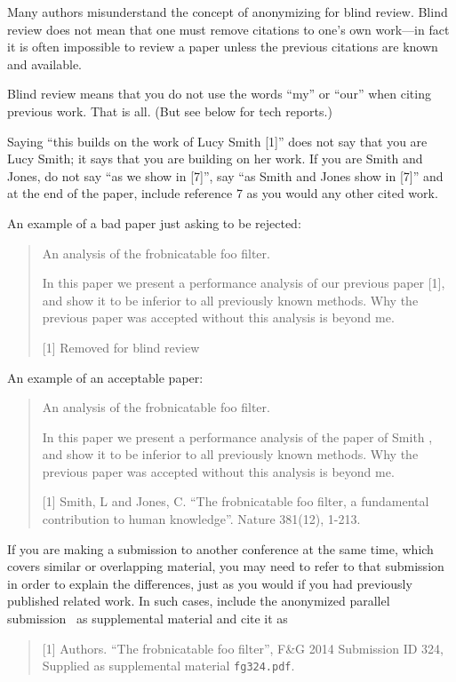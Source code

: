 \documentclass[10pt,twocolumn,letterpaper]{article}
\begin{document}
Many authors misunderstand the concept of anonymizing for blind review.
Blind review does not mean that one must remove citations to one's own work---in fact it is often impossible to review a paper unless the previous citations are known and available.

Blind review means that you do not use the words ``my'' or ``our'' when citing previous work.
That is all.
(But see below for tech reports.)

Saying ``this builds on the work of Lucy Smith [1]'' does not say that you are Lucy Smith;
it says that you are building on her work.
If you are Smith and Jones, do not say ``as we show in [7]'', say ``as Smith and Jones show in [7]'' and at the end of the paper, include reference 7 as you would any other cited work.

An example of a bad paper just asking to be rejected:
\begin{quote}
\begin{center}
    An analysis of the frobnicatable foo filter.
\end{center}

   In this paper we present a performance analysis of our previous paper [1], and show it to be inferior to all previously known methods.
   Why the previous paper was accepted without this analysis is beyond me.

   [1] Removed for blind review
\end{quote}


An example of an acceptable paper:
\begin{quote}
\begin{center}
     An analysis of the frobnicatable foo filter.
\end{center}

   In this paper we present a performance analysis of the  paper of Smith \etal [1], and show it to be inferior to all previously known methods.
   Why the previous paper was accepted without this analysis is beyond me.

   [1] Smith, L and Jones, C. ``The frobnicatable foo filter, a fundamental contribution to human knowledge''. Nature 381(12), 1-213.
\end{quote}

If you are making a submission to another conference at the same time, which covers similar or overlapping material, you may need to refer to that submission in order to explain the differences, just as you would if you had previously published related work.
In such cases, include the anonymized parallel submission~\cite{Authors14} as supplemental material and cite it as
\begin{quote}
[1] Authors. ``The frobnicatable foo filter'', F\&G 2014 Submission ID 324, Supplied as supplemental material {\tt fg324.pdf}.
\end{quote}
\end{document}
